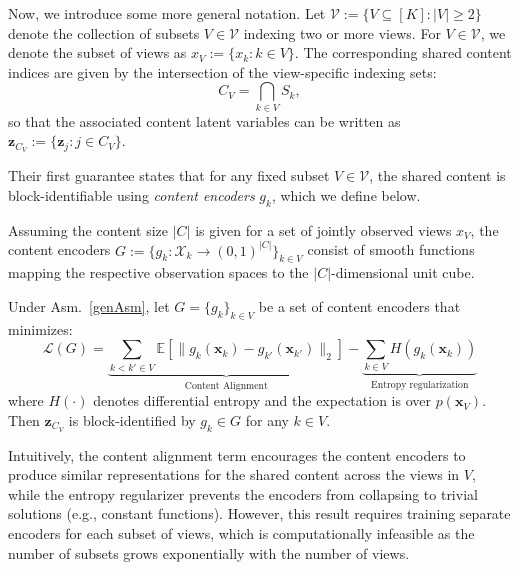 \documentclass[a4paper,12pt]{article}
\begin{document}
Now, we introduce some more general notation.
Let $\mathcal{V} := \{V \subseteq [K] : |V| \ge 2\}$ denote the collection of subsets $V \in \mathcal{V}$ indexing two or more views.
For $V \in \mathcal{V}$, we denote the subset of views as $x_V := \{x_k : k \in V\}$. The corresponding shared content indices are given by the intersection of the view-specific indexing sets:
\begin{equation*}
  C_V = \bigcap_{k \in V} S_k,
\end{equation*}
so that the associated content latent variables can be written as $\mathbf{z}_{C_V} := \{\mathbf{z}_j : j \in C_V\}$.

Their first guarantee states that for any fixed subset $V \in \mathcal{V}$, the shared content is block-identifiable using \textit{content encoders} $g_k$, which we define below.

\begin{definition}
  \label{def:content_enc}
  Assuming the content size $|C|$ is given for a set of jointly observed views $x_V$, the content encoders $G := \{g_k : \mathcal{X}_k \rightarrow (0, 1)^{|C|}\}_{k \in V}$ consist of smooth functions mapping the respective observation spaces to the $|C|$-dimensional unit cube.
\end{definition}

\begin{theorem} \label{thm:contBlock}
  Under Asm.\ \ref{genAsm}, let $G = \{g_k\}_{k \in V}$ be a set of content encoders that minimizes:
  \begin{equation}
    \mathcal{L}(G) = \underbrace{\sum_{k < k' \in V} \mathbb{E} \left[ \|g_k(\mathbf{x}_k) - g_{k'}(\mathbf{x}_{k'})\|_2 \right]}_{\text{Content Alignment}} - \underbrace{\sum_{k \in V} H(g_k(\mathbf{x}_k))}_{\text{Entropy regularization}}
  \end{equation}
  where $H(\cdot)$ denotes differential entropy and the expectation is over $p(\mathbf{x}_V)$. Then $\mathbf{z}_{C_V}$ is block-identified by $g_k \in G$ for any $k \in V$.
\end{theorem}

Intuitively, the content alignment term encourages the content encoders to produce similar representations for the shared content across the views in $V$, while the entropy regularizer prevents the encoders from collapsing to trivial solutions (e.g., constant functions). However, this result requires training separate encoders for each subset of views, which is computationally infeasible as the number of subsets grows exponentially with the number of views.
\end{document}
